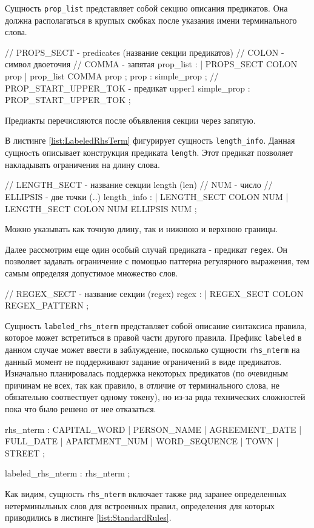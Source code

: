 Сущность \lstinline{prop_list} представляет собой секцию описания предикатов. Она должна располагаться в круглых скобках после указания имени терминального слова.
\begin{Verb}
// PROPS_SECT - predicates (название секции предикатов)
// COLON - символ двоеточия
// COMMA - запятая
prop_list
    : %
    | PROPS_SECT COLON prop
    | prop_list COMMA prop
    ;
prop
    : simple_prop
    ;
// PROP_START_UPPER_TOK - предикат upper1
simple_prop
    : PROP_START_UPPER_TOK
    ;
\end{Verb}
Предиакты перечисляются после объявления секции через запятую.

В листинге \ref{list:LabeledRhsTerm} фигурирует сущность \lstinline{length_info}. Данная сущноcть описывает конструкция предиката \lstinline{length}. Этот предикат позволяет накладывать ограничения на длину слова.
\begin{Verb}
// LENGTH_SECT - название секции length (len)
// NUM - число
// ELLIPSIS - две точки (..)
length_info
    : %
    | LENGTH_SECT COLON NUM
    | LENGTH_SECT COLON NUM ELLIPSIS NUM
    ;
\end{Verb}
Можно указывать как точную длину, так и нижнюю и верхнюю границы.

Далее рассмотрим еще один особый случай предиката - предикат \lstinline{regex}. Он позволяет задавать ограничение с помощью паттерна регулярного выражения, тем самым определяя допустимое множество слов.
\begin{Verb}
// REGEX_SECT - название секции (regex)
regex
    : %
    | REGEX_SECT COLON REGEX_PATTERN
    ;
\end{Verb}

Сущность \lstinline{labeled_rhs_nterm} представляет собой описание синтаксиса правила, которое может встретиться в правой части другого правила. Префикс \lstinline{labeled} в данном случае может ввести в заблуждение, посколько сущности \lstinline{rhs_nterm} на данный момент не поддерживают задание ограничений в виде предикатов. Изначально планировалась поддержка некоторых предикатов (по очевидным причинам не всех, так как правило, в отличие от терминального слова, не обязательно соотвествует одному токену), но из-за ряда технических сложностей пока что было решено от нее отказаться.
\begin{Verb}
rhs_nterm
    : CAPITAL_WORD
    | PERSON_NAME
    | AGREEMENT_DATE
    | FULL_DATE
    | APARTMENT_NUM
    | WORD_SEQUENCE
    | TOWN
    | STREET
    ;

labeled_rhs_nterm
    : rhs_nterm
    ;
\end{Verb}
Как видим, сущность \lstinline{rhs_nterm} включает также ряд заранее определенных нетерминыльных слов для встроенных правил, определения для которых приводились в листинге \ref{list:StandardRules}.

